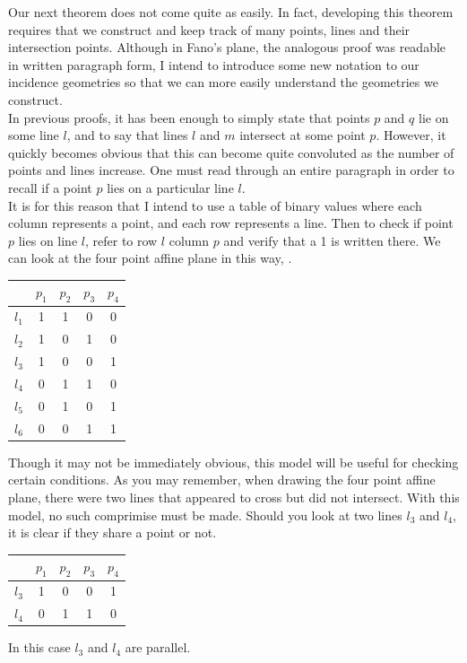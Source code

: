 \documentclass{article}
\begin{document}
Our next theorem does not come quite as easily. In fact, developing this theorem requires that we construct and keep track of many points, lines and their intersection points. Although in Fano's plane, the analogous proof was readable in written paragraph form, I intend to introduce some new notation to our incidence geometries so that we can more easily understand the geometries we construct. \\

In previous proofs, it has been enough to simply state that points $p$ and $q$ lie on some line $l$, and to say that lines $l$ and $m$ intersect at some point $p$. However, it quickly becomes obvious that this can become quite convoluted as the number of points and lines increase. One must read through an entire paragraph in order to recall if a point $p$ lies on a particular line $l$. \\

It is for this reason that I intend to use a table of binary values where each column represents a point, and each row represents a line. Then to check if point $p$ lies on line $l$, refer to row $l$ column $p$ and verify that a 1 is written there. We can look at the four point affine plane in this way, .

\begin{center}
\begin{tabular}{ c|c|c|c|c } 
 
  & $p_1$ & $p_2$ & $p_3$ &$p_4$\\ 
\hline
 $l_1$ & 1 & 1 & 0 & 0\\
 \hline
 $l_2$ & 1 & 0 & 1 & 0\\
 \hline
 $l_3$ & 1 & 0 & 0 & 1\\
 \hline
 $l_4$ & 0 & 1 & 1 & 0\\
  \hline
 $l_5$ & 0 & 1 & 0 & 1\\
 \hline
 $l_6$ & 0 & 0 & 1 & 1\\
\end{tabular}
\end{center}

Though it may not be immediately obvious, this model will be useful for checking certain conditions. As you may remember, when drawing the four point affine plane, there were two lines that appeared to cross but did not intersect. With this model, no such comprimise must be made. Should you look at two lines $l_3$ and $l_4$, it is clear if they share a point or not.
\begin{center}
\begin{tabular}{ c|c|c|c|c } 
 
  & $p_1$ & $p_2$ & $p_3$ &$p_4$\\ 
 \hline
 $l_3$ & 1 & 0 & 0 & 1\\
 \hline
 $l_4$ & 0 & 1 & 1 & 0\\
\end{tabular}
\end{center}
 In this case $l_3$ and $l_4$ are parallel. \\
 
\end{document}
